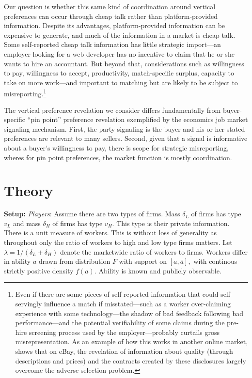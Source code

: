 \documentclass[12pt]{article}
\begin{document}
Our question is whether this same kind of coordination around vertical preferences can occur through cheap talk rather than platform-provided information.  
Despite its advantages, platform-provided information can be expensive to generate, and much of the information in a market is cheap talk.
Some self-reported cheap talk information has little strategic import---an employer looking for a web developer has no incentive to claim that he or she wants to hire an accountant.
But beyond that, considerations such as willingness to pay, willingness to accept, productivity, match-specific surplus, capacity to take on more work---and important to matching but are likely to be subject to misreporting.\footnote{
  Even if there are some pieces of self-reported information that could self-servingly influence a match if misstated---such as a worker over-claiming experience with some technology---the shadow of bad feedback following bad performance---and the potential verifiability of some claims during the pre-hire screening process used by the employer---probably curtails gross misrepresentation.
As an example of how this works in another online market, \cite{lewis2011} shows that on eBay, the revelation of information about quality (through descriptions and prices) and the contracts created by these disclosures largely overcome the adverse selection problem.
}

The vertical preference revelation we consider differs fundamentally from buyer-specific ``pin point'' preference revelation exemplified by the economics job market signaling mechanism.
First, the party signaling is the buyer and his or her stated preferences are relevant to many sellers.
Second, given that a signal is informative about a buyer's willingness to pay, there is scope for strategic misreporting, wheres for pin point preferences, the market function is mostly coordination.


\section{Theory}

\textbf{Setup:} \textit{Players}: Assume there are two types of firms.
Mass $ \delta _{L}$ of firms has type $v_{L}$ and mass $\delta _{H}$ of firms has type $v_{H}.$
This type is their private information.
There is a unit measure of workers.
This is without loss of generality as throughout only the ratio of workers to high and low type firms matters.
Let $\lambda=1/(\delta _{L}+\delta _{H})$ denote the marketwide ratio of workers to firms.
Workers differ in ability $a$ drawn from distribution $F$ with support on $[\underline{a},\bar{a}],$ with continous strictly positive density $f(a).$
Ability is known and publicly observable.
\end{document}
